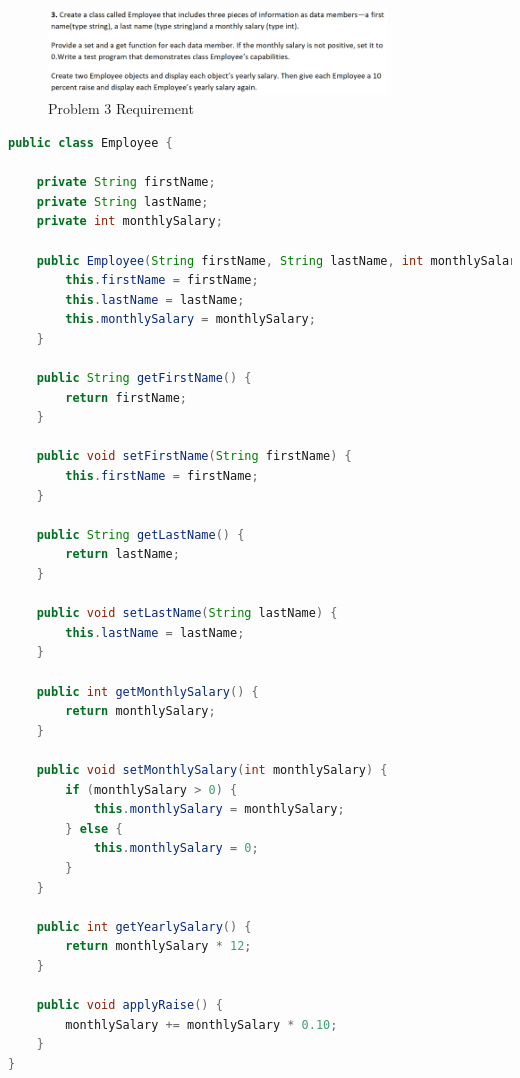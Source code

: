\documentclass{article}
\begin{document}
\begin{figure}[H]
    \centering
    \includegraphics[width=0.8\textwidth]{./Assets/Task requirements/Assignment8/3.png}
    \caption{Problem 3 Requirement}
\end{figure}

\begin{lstlisting}[language=Java, caption=Employee.java]
public class Employee {

    private String firstName;
    private String lastName;
    private int monthlySalary;

    public Employee(String firstName, String lastName, int monthlySalary) {
        this.firstName = firstName;
        this.lastName = lastName;
        this.monthlySalary = monthlySalary;
    }

    public String getFirstName() {
        return firstName;
    }

    public void setFirstName(String firstName) {
        this.firstName = firstName;
    }

    public String getLastName() {
        return lastName;
    }

    public void setLastName(String lastName) {
        this.lastName = lastName;
    }

    public int getMonthlySalary() {
        return monthlySalary;
    }

    public void setMonthlySalary(int monthlySalary) {
        if (monthlySalary > 0) {
            this.monthlySalary = monthlySalary;
        } else {
            this.monthlySalary = 0;
        }
    }

    public int getYearlySalary() {
        return monthlySalary * 12;
    }

    public void applyRaise() {
        monthlySalary += monthlySalary * 0.10;
    }
}
\end{lstlisting}
\end{document}
